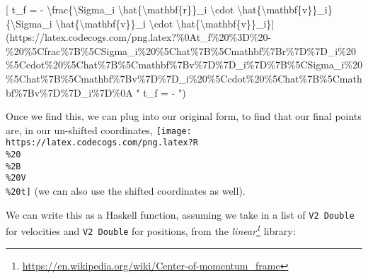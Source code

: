 \documentclass[]{article}
\renewcommand{\href}[2]{#2\footnote{\url{#1}}}
\begin{document}
{[} t\_f = - \textbackslash{}frac\{\textbackslash{}Sigma\_i
\textbackslash{}hat\{\textbackslash{}mathbf\{r\}\}\_i \textbackslash{}cdot
\textbackslash{}hat\{\textbackslash{}mathbf\{v\}\}\_i\}\{\textbackslash{}Sigma\_i
\textbackslash{}hat\{\textbackslash{}mathbf\{v\}\}\_i \textbackslash{}cdot
\textbackslash{}hat\{\textbackslash{}mathbf\{v\}\}\_i\}{]}(https://latex.codecogs.com/png.latex?\%0At\_f\%20\%3D\%20-\%20\%5Cfrac\%7B\%5CSigma\_i\%20\%5Chat\%7B\%5Cmathbf\%7Br\%7D\%7D\_i\%20\%5Ccdot\%20\%5Chat\%7B\%5Cmathbf\%7Bv\%7D\%7D\_i\%7D\%7B\%5CSigma\_i\%20\%5Chat\%7B\%5Cmathbf\%7Bv\%7D\%7D\_i\%20\%5Ccdot\%20\%5Chat\%7B\%5Cmathbf\%7Bv\%7D\%7D\_i\%7D\%0A
" t\_f = -
")

Once we find this, we can plug into our original form, to find that our final
points are, in our un-shifted coordinates,
\texttt{[image: https://latex.codecogs.com/png.latex?R\\\%20\\\%2B\\\%20V\\\%20t]} (we
can also use the shifted coordinates as well).

We can write this as a Haskell function, assuming we take in a list of
\texttt{V2\ Double} for velocities and \texttt{V2\ Double} for positions, from
the \emph{\href{https://en.wikipedia.org/wiki/Center-of-momentum_frame}{linear}}
library:
\end{document}
